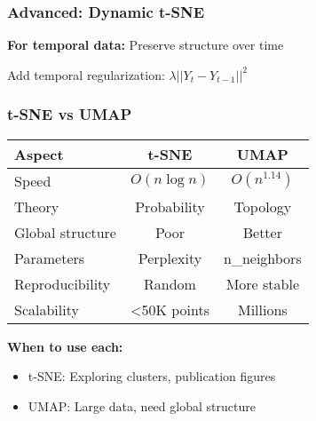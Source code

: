 \documentclass[aspectratio=169]{beamer}
\begin{document}
\begin{frame}
\frametitle{Advanced: Dynamic t-SNE}

\textbf{For temporal data:} Preserve structure over time

\begin{center}
\end{center}

Add temporal regularization: $\lambda||Y_t - Y_{t-1}||^2$

\end{frame}

\begin{frame}
\frametitle{t-SNE vs UMAP}

\begin{center}
\small
\begin{tabular}{l|c|c}
\textbf{Aspect} & \textbf{t-SNE} & \textbf{UMAP}\\
\hline
Speed & $O(n \log n)$ & $O(n^{1.14})$\\
Theory & Probability & Topology\\
Global structure & Poor & Better\\
Parameters & Perplexity & n\_neighbors\\
Reproducibility & Random & More stable\\
Scalability & <50K points & Millions\\
\end{tabular}
\end{center}

\vspace{0.3cm}
\textbf{When to use each:}
\begin{itemize}
\item t-SNE: Exploring clusters, publication figures
\item UMAP: Large data, need global structure
\end{itemize}

\end{frame}
\end{document}
